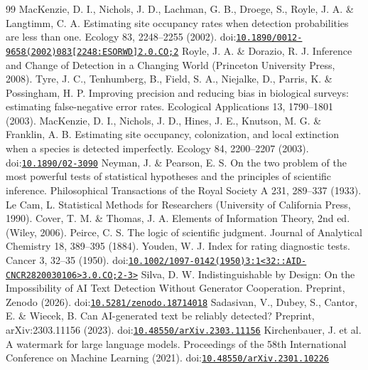 \documentclass[11pt,a4paper]{article}
\theoremstyle{definition}
\theoremstyle{remark}
\begin{document}
\begin{thebibliography}{99}
 MacKenzie, D. I., Nichols, J. D., Lachman, G. B., Droege, S., Royle, J. A. \& Langtimm, C. A. Estimating site occupancy rates when detection probabilities are less than one. Ecology 83, 2248–2255 (2002). doi:\href{https://doi.org/10.1890/0012-9658(2002)083[2248:ESORWD]2.0.CO;2}{\nolinkurl{10.1890/0012-9658(2002)083[2248:ESORWD]2.0.CO;2}}
 Royle, J. A. \& Dorazio, R. J. Inference and Change of Detection in a Changing World (Princeton University Press, 2008).
 Tyre, J. C., Tenhumberg, B., Field, S. A., Niejalke, D., Parris, K. \& Possingham, H. P. Improving precision and reducing bias in biological surveys: estimating false-negative error rates. Ecological Applications 13, 1790–1801 (2003).
 MacKenzie, D. I., Nichols, J. D., Hines, J. E., Knutson, M. G. \& Franklin, A. B. Estimating site occupancy, colonization, and local extinction when a species is detected imperfectly. Ecology 84, 2200–2207 (2003). doi:\href{https://doi.org/10.1890/02-3090}{\nolinkurl{10.1890/02-3090}}
 Neyman, J. \& Pearson, E. S. On the two problem of the most powerful tests of statistical hypotheses and the principles of scientific inference. Philosophical Transactions of the Royal Society A 231, 289–337 (1933).
 Le Cam, L. Statistical Methods for Researchers (University of California Press, 1990).
 Cover, T. M. \& Thomas, J. A. Elements of Information Theory, 2nd ed. (Wiley, 2006).
 Peirce, C. S. The logic of scientific judgment. Journal of Analytical Chemistry 18, 389–395 (1884).
 Youden, W. J. Index for rating diagnostic tests. Cancer 3, 32–35 (1950). doi:\href{https://doi.org/10.1002/1097-0142(1950)3:1<32::AID-CNCR2820030106>3.0.CO;2-3>}{\nolinkurl{10.1002/1097-0142(1950)3:1<32::AID-CNCR2820030106>3.0.CO;2-3>}}
 Silva, D. W. Indistinguishable by Design: On the Impossibility of AI Text Detection Without Generator Cooperation. Preprint, Zenodo (2026). doi:\href{https://doi.org/10.5281/zenodo.18714018}{\nolinkurl{10.5281/zenodo.18714018}}
 Sadasivan, V., Dubey, S., Cantor, E. \& Wiecek, B. Can AI-generated text be reliably detected? Preprint, arXiv:2303.11156 (2023). doi:\href{https://doi.org/10.48550/arXiv.2303.11156}{\nolinkurl{10.48550/arXiv.2303.11156}}
 Kirchenbauer, J. et al. A watermark for large language models. Proceedings of the 58th International Conference on Machine Learning (2021). doi:\href{https://doi.org/10.48550/arXiv.2301.10226}{\nolinkurl{10.48550/arXiv.2301.10226}}

\end{thebibliography}
\end{document}

